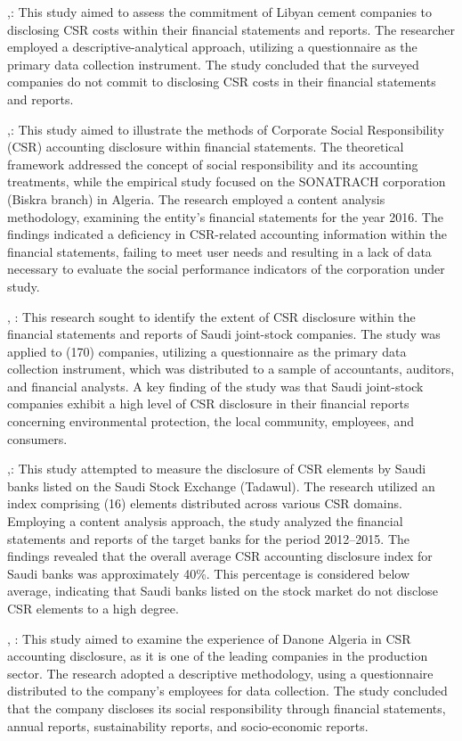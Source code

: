 \documentclass{default}
\begin{document}
\cite{ref23},: This study aimed to assess the commitment of Libyan cement companies to disclosing CSR costs within their financial statements and reports. The researcher employed a descriptive-analytical approach, utilizing a questionnaire as the primary data collection instrument. The study concluded that the surveyed companies do not commit to disclosing CSR costs in their financial statements and reports.

\cite{ref10},: This study aimed to illustrate the methods of Corporate Social Responsibility (CSR) accounting disclosure within financial statements. The theoretical framework addressed the concept of social responsibility and its accounting treatments, while the empirical study focused on the SONATRACH corporation (Biskra branch) in Algeria. The research employed a content analysis methodology, examining the entity's financial statements for the year 2016. The findings indicated a deficiency in CSR-related accounting information within the financial statements, failing to meet user needs and resulting in a lack of data necessary to evaluate the social performance indicators of the corporation under study.

\cite{ref27}, : This research sought to identify the extent of CSR disclosure within the financial statements and reports of Saudi joint-stock companies. The study was applied to (170) companies, utilizing a questionnaire as the primary data collection instrument, which was distributed to a sample of accountants, auditors, and financial analysts. A key finding of the study was that Saudi joint-stock companies exhibit a high level of CSR disclosure in their financial reports concerning environmental protection, the local community, employees, and consumers.

\cite{ref5},: This study attempted to measure the disclosure of CSR elements by Saudi banks listed on the Saudi Stock Exchange (Tadawul). The research utilized an index comprising (16) elements distributed across various CSR domains. Employing a content analysis approach, the study analyzed the financial statements and reports of the target banks for the period 2012–2015. The findings revealed that the overall average CSR accounting disclosure index for Saudi banks was approximately 40\%. This percentage is considered below average, indicating that Saudi banks listed on the stock market do not disclose CSR elements to a high degree.

\cite{ref22}, : This study aimed to examine the experience of Danone Algeria in CSR accounting disclosure, as it is one of the leading companies in the production sector. The research adopted a descriptive methodology, using a questionnaire distributed to the company’s employees for data collection. The study concluded that the company discloses its social responsibility through financial statements, annual reports, sustainability reports, and socio-economic reports.
\end{document}
